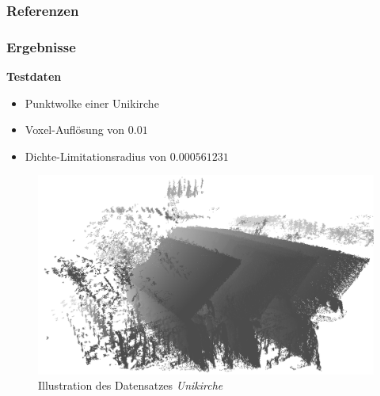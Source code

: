 \documentclass[presentation]{beamer}
\begin{document}
\begin{frame}[allowframebreaks]
	\frametitle{Referenzen}
	\tiny
	\printbibliography[heading=none]
\end{frame}
 
 
 
 
\begin{frame}
\frametitle{Ergebnisse}
\baselineskip
\color{dd-gray} \textbf{Testdaten} \color{black}


\begin{itemize}
	\item Punktwolke einer Unikirche
	\item Voxel-Auflösung von $0.01$
	\item Dichte-Limitationsradius von $0.000561231$ 
\end{itemize}

\begin{figure}
	\centering
	\includegraphics[width=0.55\linewidth]{figures/Unikirche2.png}
	\caption{Illustration des Datensatzes \emph{Unikirche}}
	\label{fig:sub11}
\end{figure}
\end{frame}
\end{document}
